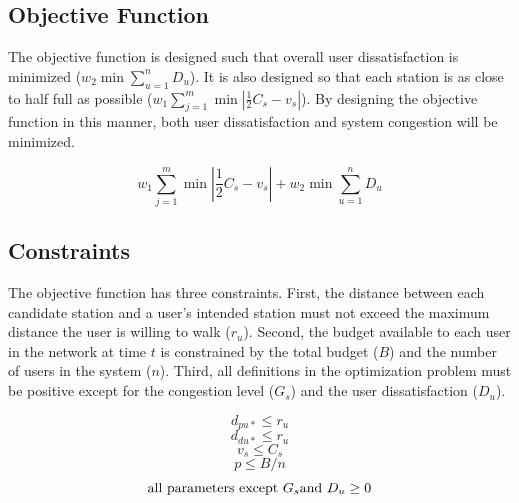 \documentclass[times, 10pt,twocolumn]{article}
\begin{document}
\subsection{Objective Function}
 
 The objective function is designed such that overall user dissatisfaction is minimized ($w_2\min{\sum_{u=1}^{n}D_u}$). It is also designed so that each station is as close to half full as possible ($w_1\sum_{j=1}^{m}\min{|\frac{1}{2}C_s - v_s|}$). By designing the objective function in this manner, both user dissatisfaction and system congestion will be minimized.

\begin{equation}
w_1\sum_{j=1}^{m}\min{|\frac{1}{2}C_s - v_s|} + w_2\min{\sum_{u=1}^{n}D_u}
\end{equation}

\subsection{Constraints}

The objective function has three constraints. First, the distance between each candidate station and a user's intended station must not exceed the maximum distance the user is willing to walk ($r_u$). Second, the budget available to each user in the network at time $t$ is constrained by the total budget ($B$) and the number of users in the system ($n$). Third, all definitions in the optimization problem must be positive except for the congestion level ($G_s$) and the user dissatisfaction ($D_u$).

\begin{equation}
d_{pu*} \leq r_u
\end{equation}
\begin{equation}
d_{du*} \leq r_u
\end{equation}
\begin{equation}
v_s \leq C_s
\end{equation}
\begin{equation}
p \leq B/n
\end{equation}
\begin{equation}
\textnormal{all parameters except } G_s \textnormal{and } D_u \geq 0
\end{equation}
\end{document}
